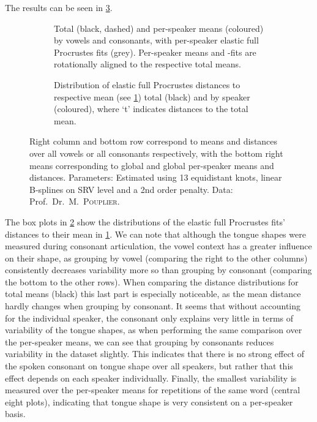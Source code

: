 The results can be seen in \cref{fig:4-tounges}.
\begin{figure}
  \centering
  \advance\leftskip-1cm
  \begin{subfigure}[t]{0.72\textwidth}
    \centering
    \centering
    \caption{Total (black, dashed) and per-speaker means (coloured) by vowels and consonants, with per-speaker elastic full Procrustes fits (grey). 
    Per-speaker means and -fits are rotationally aligned to the respective total means.}
    \label{fig:4-tongue-means}
  \end{subfigure}%
  \begin{subfigure}[t]{0.40\textwidth}
    \centering
    \centering
    \caption{Distribution of elastic full Procrustes distances to respective mean (see \cref{fig:4-tongue-means}) total (black) and by speaker (coloured), where \enquote*{t} indicates distances to the total mean.}
    \label{fig:4-tongue-dists}
  \end{subfigure}
  \caption{Right column and bottom row correspond to means and distances over all vowels or all consonants respectively, with the bottom right means corresponding to global and global per-speaker means and distances.
    Parameters: Estimated using 13 equidistant knots, linear B-splines on SRV level and a 2nd order penalty.
    Data: Prof.\ Dr.\ M.\ \textsc{Pouplier}.}
  \label{fig:4-tounges}
\end{figure}
The box plots in \cref{fig:4-tongue-dists} show the distributions of the elastic full Procrustes fits' distances to their  mean in \cref{fig:4-tongue-means}.
We can note that although the tongue shapes were measured during consonant articulation, the vowel context has a greater influence on their shape, as grouping by vowel (comparing the right to the other columns) consistently decreases variability more so than grouping by consonant (comparing the bottom to the other rows). 
When comparing the distance distributions for total means (black) this last part is especially noticeable, as the mean distance hardly changes when grouping by consonant.
It seems that without accounting for the individual speaker, the consonant only explains very little in terms of variability of the tongue shapes, as when performing the same comparison over the per-speaker means, we can see that grouping by consonants reduces variability in the dataset slightly.
This indicates that there is no strong effect of the spoken consonant on tongue shape over all speakers, but rather that this effect depends on each speaker individually.
Finally, the smallest variability is measured over the per-speaker means for repetitions of the same word (central eight plots), indicating that tongue shape is very consistent on a per-speaker basis.

